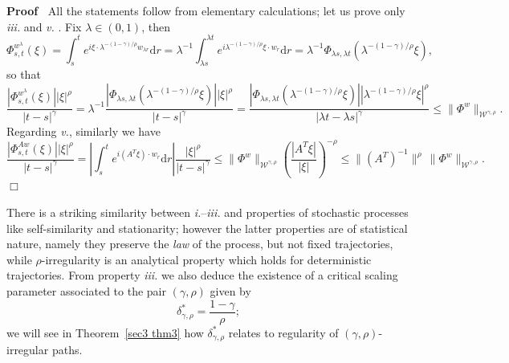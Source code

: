 \documentclass[10pt]{article}
\newcommand{\comma}{{,}}
\newcommand{\mathd}{\mathrm{d}}
\newcommand{\tmem}[1]{{\em #1\/}}
\newcommand{\tmtextit}[1]{{\itshape{#1}}}
\newenvironment{proof}{\noindent\textbf{Proof\ }}{\hspace*{\fill}$\Box$\medskip}
\begin{document}
\begin{proof}
  All the statements follow from elementary calculations; let us prove only
  {\tmem{iii.}} and {\tmem{v.}} . Fix $\lambda \in (0, 1)$, then
  \[ \Phi_{s, t}^{w^{\lambda}} (\xi) = \int_s^t e^{i \xi \cdot \lambda^{- (1 -
     \gamma) / \rho} w_{\lambda r}} \mathd r = \lambda^{- 1} \int_{\lambda
     s}^{\lambda t} e^{i \lambda^{- (1 - \gamma) / \rho} \xi \cdot w_r} \mathd
     r = \lambda^{- 1} \Phi_{\lambda s, \lambda t} (\lambda^{- (1 - \gamma) /
     \rho} \xi), \]
  so that
  \[ \frac{| \Phi_{s, t}^{w^{\lambda}} (\xi) | | \xi |^{\rho}}{| t - s
     |^{\gamma}} = \lambda^{- 1} \frac{| \Phi_{\lambda s, \lambda t}
     (\lambda^{- (1 - \gamma) / \rho} \xi) | | \xi |^{\rho}}{| t - s
     |^{\gamma}} = \frac{| \Phi_{\lambda s, \lambda t} (\lambda^{- (1 -
     \gamma) / \rho} \xi) | | \lambda^{- (1 - \gamma) / \rho} \xi |^{\rho}}{|
     \lambda t - \lambda s |^{\gamma}} \leqslant \| \Phi^w
     \|_{\mathcal{W}^{\gamma, \rho}} . \]
  Regarding {\tmem{v.}}, similarly we have
  \[ \frac{| \Phi^{A w}_{s, t} (\xi) | | \xi |^{\rho}}{| t - s |^{\gamma}} =
     \left| \int_s^t e^{i (A^T \xi) \cdot w_r} \mathd r \right| \frac{| \xi
     |^{\rho}}{| t - s |^{\gamma}} \leqslant \| \Phi^w
     \|_{\mathcal{W}^{\gamma, \rho}} \left( \frac{| A^T \xi |}{| \xi |}
     \right)^{- \rho} \leqslant \| (A^T)^{- 1} \|^{\rho} \, \| \Phi^w
     \|_{\mathcal{W}^{\gamma \comma \rho}} . \]
\end{proof}

\begin{remark}
  There is a striking similarity between \tmtextit{i.}--\tmtextit{iii.} and
  properties of stochastic processes like self\mbox{-}similarity and
  stationarity; however the latter properties are of statistical nature,
  namely they preserve the \tmtextit{law} of the process, but not fixed
  trajectories, while $\rho$\mbox{-}irregularity is an analytical property
  which holds for deterministic trajectories. From property \tmtextit{iii.} we
  also deduce the existence of a critical scaling parameter associated to the
  pair $(\gamma, \rho)$ given by
  \begin{equation}
    \delta^{\ast}_{\gamma, \rho} = \frac{1 - \gamma}{\rho} ; \label{sec2.2
    critical parameter}
  \end{equation}
  we will see in Theorem~\ref{sec3 thm3} how $\delta^{\ast}_{\gamma, \rho}$
  relates to regularity of $(\gamma, \rho)$\mbox{-}irregular paths.
\end{remark}
\end{document}
